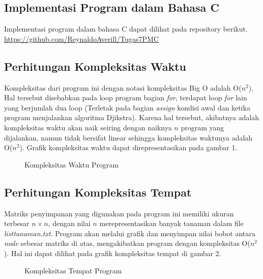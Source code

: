 \documentclass[conference]{IEEEtran}
\begin{document}
	\subsection{Implementasi Program dalam Bahasa C}
	Implementasi program dalam bahasa C dapat dilihat pada repository berikut. \textcolor{blue}{\url{https://github.com/ReynaldoAverill/Tugas7PMC}}
	\subsection{Perhitungan Kompleksitas Waktu}
	Kompleksitas dari program ini dengan notasi kompleksitas Big O adalah O(\begin{math} n^2 \end{math}). Hal tersebut disebabkan pada loop program bagian \textit{for}, terdapat loop \textit{for} lain yang berjumlah dua loop (Terletak pada bagian \textit{assign} kondisi awal dan ketika program menjalankan algoritma Djikstra). Karena hal tersebut, akibatnya adalah kompleksitas waktu akan naik seiring dengan naiknya \begin{math} n \end{math} program yang dijalankan, namun tidak bersifat linear sehingga kompleksitas waktunya adalah O(\begin{math} n^2 \end{math}). Grafik kompleksitas waktu dapat direpresentasikan pada gambar 1.
	\begin{figure}[htbp]
	\centering
	\scalebox{0.4}{}
	\caption{Kompleksitas Waktu Program}
	\end{figure}
	\subsection{ Perhitungan Kompleksitas Tempat}
	Matriks penyimpanan yang digunakan pada program ini memiliki ukuran terbesar \begin{math} n \times n \end{math}, dengan nilai \begin{math} n \end{math} merepresentasikan banyak tanaman dalam file \textit{listtanaman.txt}. Program akan melalui grafik dan menyimpan nilai bobot antara \textit{node} sebesar matriks di atas, mengakibatkan program dengan kompleksitas O(\begin{math} n^2 \end{math}). Hal ini dapat dilihat pada grafik kompleksitas tempat di gambar 2.
	\begin{figure}[htbp]
	\centering
	\scalebox{0.4}{}
	\caption{Kompleksitas Tempat Program}
	\end{figure}
\end{document}
